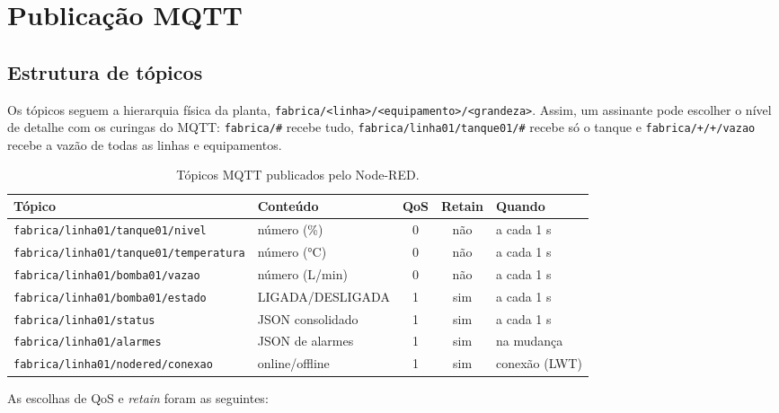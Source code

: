 \documentclass[11pt,a4paper]{article}
\begin{document}
\section{Publicação MQTT}

\subsection{Estrutura de tópicos}

Os tópicos seguem a hierarquia física da planta,
\texttt{fabrica/<linha>/<equipamento>/<grandeza>}. Assim, um assinante pode
escolher o nível de detalhe com os curingas do MQTT: \texttt{fabrica/\#}
recebe tudo, \texttt{fabrica/linha01/tanque01/\#} recebe só o tanque e
\texttt{fabrica/+/+/vazao} recebe a vazão de todas as linhas e equipamentos.

\begin{table}[H]
\centering
\small
\caption{Tópicos MQTT publicados pelo Node-RED.}
\label{tab:topicos}
\begin{tabularx}{\linewidth}{@{}l l c c L@{}}
\toprule
\textbf{Tópico} & \textbf{Conteúdo} & \textbf{QoS} & \textbf{Retain} & \textbf{Quando} \\
\midrule
\texttt{fabrica/linha01/tanque01/nivel}       & número (\%)      & 0 & não & a cada 1 s \\
\texttt{fabrica/linha01/tanque01/temperatura} & número (°C)      & 0 & não & a cada 1 s \\
\texttt{fabrica/linha01/bomba01/vazao}        & número (L/min)   & 0 & não & a cada 1 s \\
\texttt{fabrica/linha01/bomba01/estado}       & LIGADA/DESLIGADA & 1 & sim & a cada 1 s \\
\texttt{fabrica/linha01/status}               & JSON consolidado & 1 & sim & a cada 1 s \\
\texttt{fabrica/linha01/alarmes}              & JSON de alarmes  & 1 & sim & na mudança \\
\texttt{fabrica/linha01/nodered/conexao}      & online/offline   & 1 & sim & conexão (LWT) \\
\bottomrule
\end{tabularx}
\end{table}

As escolhas de QoS e \emph{retain} foram as seguintes:
\end{document}
